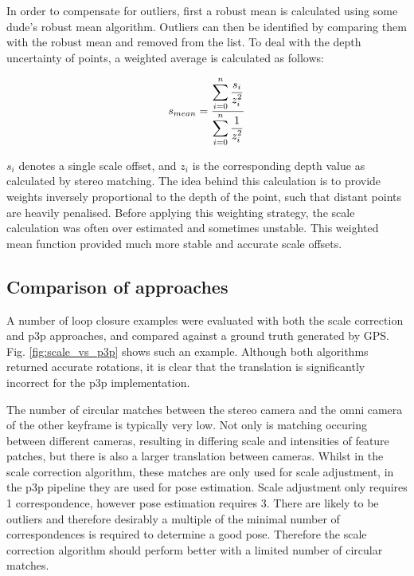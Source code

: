 In order to compensate for outliers, first a robust mean is calculated using some dude's robust mean algorithm.  Outliers can then be identified by comparing them with the robust mean and removed from the list. To deal with the depth uncertainty of points, a weighted average is calculated as follows:

\begin{equation}
\centering
s_{mean} = \dfrac{\displaystyle\sum\limits_{i=0}^n{\dfrac{s_i}{z_i^2}}}
{\displaystyle\sum\limits_{i=0}^n{\dfrac{1}{z_i^2}}}
\end{equation}

$s_i$ denotes a single scale offset, and $z_i$ is the corresponding depth value as calculated by stereo matching.  The idea behind this calculation is to provide weights inversely proportional to the depth of the point, such that distant points are heavily penalised.  Before applying this weighting strategy, the scale calculation was often over estimated and sometimes unstable.  This weighted mean function provided much more stable and accurate scale offsets.



\subsection{Comparison of approaches}

A number of loop closure examples were evaluated with both the scale correction and p3p approaches, and compared against a ground truth generated by GPS.  Fig. \ref{fig:scale_vs_p3p} shows such an example.  Although both algorithms returned accurate rotations, it is clear that the translation is significantly incorrect for the p3p implementation.

The number of circular matches between the stereo camera and the omni camera of the other keyframe is typically very low.  Not only is matching occuring between different cameras, resulting in differing scale and intensities of feature patches, but there is also a larger translation between cameras. Whilst in the scale correction algorithm, these matches are only used for scale adjustment, in the p3p pipeline they are used for pose estimation.  Scale adjustment only requires 1 correspondence, however pose estimation requires 3.  There are likely to be outliers and therefore desirably a multiple of the minimal number of correspondences is required to determine a good pose.  Therefore the scale correction algorithm should perform better with a limited number of circular matches.

